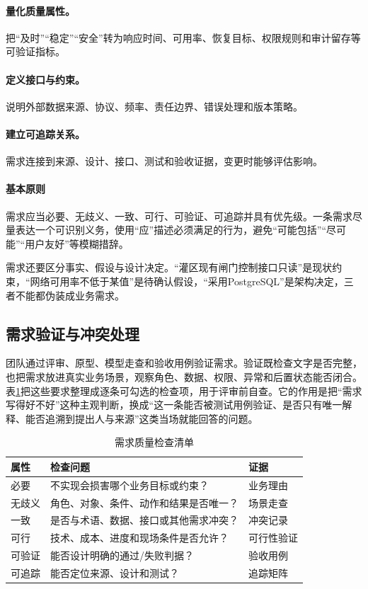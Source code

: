 \paragraph{量化质量属性。} 把“及时”“稳定”“安全”转为响应时间、可用率、恢复目标、权限规则和审计留存等可验证指标。

\paragraph{定义接口与约束。} 说明外部数据来源、协议、频率、责任边界、错误处理和版本策略。

\paragraph{建立可追踪关系。} 需求连接到来源、设计、接口、测试和验收证据，变更时能够评估影响。

\paragraph{基本原则}需求应当必要、无歧义、一致、可行、可验证、可追踪并具有优先级\cite{wiegers2013,robertson2012}。一条需求尽量表达一个可识别义务，使用“应”描述必须满足的行为，避免“可能包括”“尽可能”“用户友好”等模糊措辞。

需求还要区分事实、假设与设计决定。“灌区现有闸门控制接口只读”是现状约束，“网络可用率不低于某值”是待确认假设，“采用PostgreSQL”是架构决定，三者不能都伪装成业务需求。

\subsection{需求验证与冲突处理}

团队通过评审、原型、模型走查和验收用例验证需求。验证既检查文字是否完整，也把需求放进真实业务场景，观察角色、数据、权限、异常和后置状态能否闭合。表\ref{tab:requirement-quality-check}把这些要求整理成逐条可勾选的检查项，用于评审前自查。它的作用是把“需求写得好不好”这种主观判断，换成“这一条能否被测试用例验证、是否只有唯一解释、能否追溯到提出人与来源”这类当场就能回答的问题。

\begin{table}[htbp]
\centering
\caption{需求质量检查清单}
\label{tab:requirement-quality-check}
\begin{tabular}{p{2.4cm}p{7.2cm}p{3.0cm}}
\toprule
属性 & 检查问题 & 证据 \\
\midrule
必要 & 不实现会损害哪个业务目标或约束？ & 业务理由 \\
无歧义 & 角色、对象、条件、动作和结果是否唯一？ & 场景走查 \\
一致 & 是否与术语、数据、接口或其他需求冲突？ & 冲突记录 \\
可行 & 技术、成本、进度和现场条件是否允许？ & 可行性验证 \\
可验证 & 能否设计明确的通过/失败判据？ & 验收用例 \\
可追踪 & 能否定位来源、设计和测试？ & 追踪矩阵 \\
\bottomrule
\end{tabular}
\end{table}

